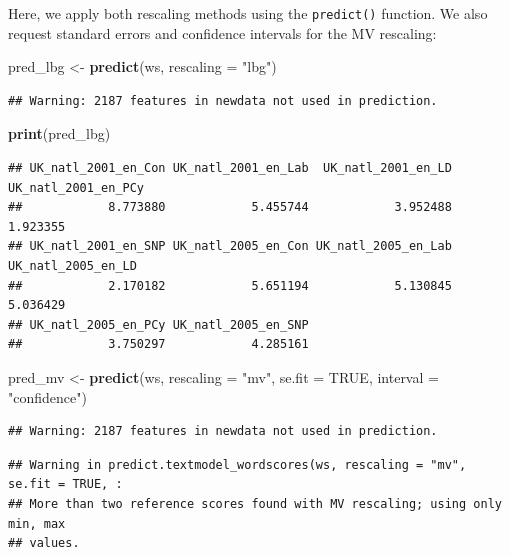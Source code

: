 \documentclass[
]{book}
\newenvironment{Shaded}{\begin{snugshade}}{\end{snugshade}}
\newcommand{\AttributeTok}[1]{\textcolor[rgb]{0.13,0.29,0.53}{#1}}
\newcommand{\ConstantTok}[1]{\textcolor[rgb]{0.56,0.35,0.01}{#1}}
\newcommand{\FunctionTok}[1]{\textcolor[rgb]{0.13,0.29,0.53}{\textbf{#1}}}
\newcommand{\NormalTok}[1]{#1}
\newcommand{\OtherTok}[1]{\textcolor[rgb]{0.56,0.35,0.01}{#1}}
\newcommand{\StringTok}[1]{\textcolor[rgb]{0.31,0.60,0.02}{#1}}
\begin{document}
Here, we apply both rescaling methods using the \texttt{predict()} function. We also request standard errors and confidence intervals for the MV rescaling:

\begin{Shaded}
\begin{Highlighting}[]
\NormalTok{pred\_lbg }\OtherTok{\textless{}{-}} \FunctionTok{predict}\NormalTok{(ws, }\AttributeTok{rescaling =} \StringTok{"lbg"}\NormalTok{)}
\end{Highlighting}
\end{Shaded}

\begin{verbatim}
## Warning: 2187 features in newdata not used in prediction.
\end{verbatim}

\begin{Shaded}
\begin{Highlighting}[]
\FunctionTok{print}\NormalTok{(pred\_lbg)}
\end{Highlighting}
\end{Shaded}

\begin{verbatim}
## UK_natl_2001_en_Con UK_natl_2001_en_Lab  UK_natl_2001_en_LD UK_natl_2001_en_PCy 
##            8.773880            5.455744            3.952488            1.923355 
## UK_natl_2001_en_SNP UK_natl_2005_en_Con UK_natl_2005_en_Lab  UK_natl_2005_en_LD 
##            2.170182            5.651194            5.130845            5.036429 
## UK_natl_2005_en_PCy UK_natl_2005_en_SNP 
##            3.750297            4.285161
\end{verbatim}

\begin{Shaded}
\begin{Highlighting}[]
\NormalTok{pred\_mv }\OtherTok{\textless{}{-}} \FunctionTok{predict}\NormalTok{(ws, }\AttributeTok{rescaling =} \StringTok{"mv"}\NormalTok{, }\AttributeTok{se.fit =} \ConstantTok{TRUE}\NormalTok{, }\AttributeTok{interval =} \StringTok{"confidence"}\NormalTok{)}
\end{Highlighting}
\end{Shaded}

\begin{verbatim}
## Warning: 2187 features in newdata not used in prediction.
\end{verbatim}

\begin{verbatim}
## Warning in predict.textmodel_wordscores(ws, rescaling = "mv", se.fit = TRUE, :
## More than two reference scores found with MV rescaling; using only min, max
## values.
\end{verbatim}
\end{document}
